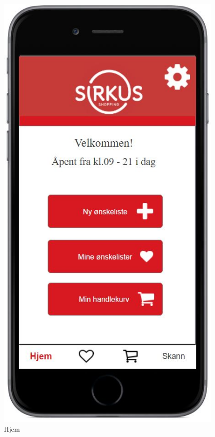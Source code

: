 \begin{figure}[H]
\includegraphics[scale=0.55]{images/axurebilder/hjem}
\centering %
\caption{Hjem}
\label{fig:hjem}
\end{figure}

